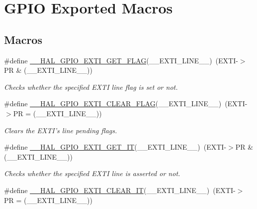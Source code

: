 \hypertarget{group___g_p_i_o___exported___macros}{\section{G\-P\-I\-O Exported Macros}
\label{group___g_p_i_o___exported___macros}
}
\subsection*{Macros}
\begin{DoxyCompactItemize}
\item 
\#define \hyperlink{group___g_p_i_o___exported___macros_gaae18fc8d92ffa4df2172c78869e712fc}{\-\_\-\-\_\-\-H\-A\-L\-\_\-\-G\-P\-I\-O\-\_\-\-E\-X\-T\-I\-\_\-\-G\-E\-T\-\_\-\-F\-L\-A\-G}(\-\_\-\-\_\-\-E\-X\-T\-I\-\_\-\-L\-I\-N\-E\-\_\-\-\_\-)~(E\-X\-T\-I-\/$>$P\-R \& (\-\_\-\-\_\-\-E\-X\-T\-I\-\_\-\-L\-I\-N\-E\-\_\-\-\_\-))
\begin{DoxyCompactList}\small\item\em Checks whether the specified E\-X\-T\-I line flag is set or not. \end{DoxyCompactList}\item 
\#define \hyperlink{group___g_p_i_o___exported___macros_ga2f28fc349d1812cdc55a77c68d2b278d}{\-\_\-\-\_\-\-H\-A\-L\-\_\-\-G\-P\-I\-O\-\_\-\-E\-X\-T\-I\-\_\-\-C\-L\-E\-A\-R\-\_\-\-F\-L\-A\-G}(\-\_\-\-\_\-\-E\-X\-T\-I\-\_\-\-L\-I\-N\-E\-\_\-\-\_\-)~(E\-X\-T\-I-\/$>$P\-R = (\-\_\-\-\_\-\-E\-X\-T\-I\-\_\-\-L\-I\-N\-E\-\_\-\-\_\-))
\begin{DoxyCompactList}\small\item\em Clears the E\-X\-T\-I's line pending flags. \end{DoxyCompactList}\item 
\#define \hyperlink{group___g_p_i_o___exported___macros_ga27f0e1f6c38745169d74620f6a178a94}{\-\_\-\-\_\-\-H\-A\-L\-\_\-\-G\-P\-I\-O\-\_\-\-E\-X\-T\-I\-\_\-\-G\-E\-T\-\_\-\-I\-T}(\-\_\-\-\_\-\-E\-X\-T\-I\-\_\-\-L\-I\-N\-E\-\_\-\-\_\-)~(E\-X\-T\-I-\/$>$P\-R \& (\-\_\-\-\_\-\-E\-X\-T\-I\-\_\-\-L\-I\-N\-E\-\_\-\-\_\-))
\begin{DoxyCompactList}\small\item\em Checks whether the specified E\-X\-T\-I line is asserted or not. \end{DoxyCompactList}\item 
\#define \hyperlink{group___g_p_i_o___exported___macros_ga2a086506eec826f49b200fba64beb9f1}{\-\_\-\-\_\-\-H\-A\-L\-\_\-\-G\-P\-I\-O\-\_\-\-E\-X\-T\-I\-\_\-\-C\-L\-E\-A\-R\-\_\-\-I\-T}(\-\_\-\-\_\-\-E\-X\-T\-I\-\_\-\-L\-I\-N\-E\-\_\-\-\_\-)~(E\-X\-T\-I-\/$>$P\-R = (\-\_\-\-\_\-\-E\-X\-T\-I\-\_\-\-L\-I\-N\-E\-\_\-\-\_\-))

\end{DoxyCompactItemize}
